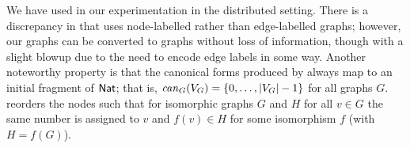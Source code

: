 We have used \BLISS in our experimentation in the distributed setting.
There is a discrepancy in that
\BLISS uses node-labelled rather than edge-labelled graphs; however, our graphs
can be converted to \BLISS graphs without loss of information, though with a
slight blowup due to the need to encode edge labels in some way. Another
noteworthy property is that the canonical forms produced by \BLISS always map
to an initial fragment of $\mathsf{Nat}$; that is, $\mathit{can}_G(V_G)={\{ 0,\ldots,|V_G|-1 \}}$
for all graphs $G$.
\BLISS reorders the nodes such that for isomorphic graphs $G$ and 
$H$ for all $v \in G$ the same number is assigned to $v$ and $f(v) \in H$ for some 
isomorphism $f$ (with $H=f(G)$).

